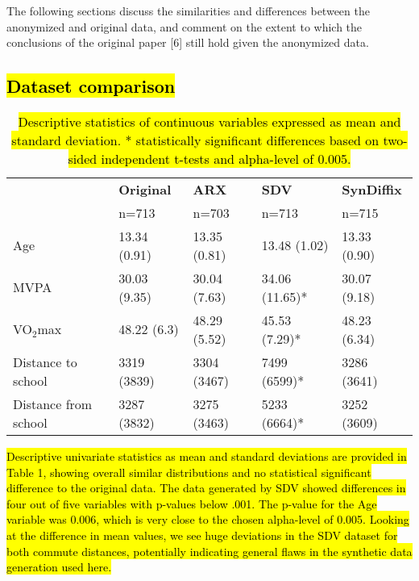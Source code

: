 \documentclass[10pt]{article}
\newcommand{\mycite}[1]{[#1]}
\begin{document}
The following sections discuss the similarities and differences between the anonymized and original data, and comment on the extent to which the conclusions of the original paper \mycite{6} still hold given the anonymized data.

\subsection*{\hl{Dataset comparison}}

\setlength{\fboxsep}{0pt}
\begin{table}
      \begin{center}
      \begin{small}
\begin{tabular}{lllll}
\toprule
 & \textbf{Original}  & \textbf{ARX} & \textbf{SDV} & \textbf{SynDiffix} \\
 & n=713 & n=703  & n=713  & n=715   \\
\midrule
Age & 13.34 (0.91) & 13.35 (0.81)  & 13.48 (1.02)  & 13.33 (0.90) \\
MVPA & 30.03 (9.35) & 30.04 (7.63) & 34.06 (11.65)* & 30.07 (9.18) \\
VO$_2$max & 48.22 (6.3) & 48.29 (5.52)  & 45.53 (7.29)*  & 48.23 (6.34) \\
Distance to school & 3319 (3839) & 3304 (3467) & 7499 (6599)* & 3286 (3641) \\
Distance from school & 3287 (3832) & 3275 (3463) & 5233 (6664)* & 3252 (3609) \\
\bottomrule
\end{tabular}
      \end{small}
      \caption{\hl{Descriptive statistics of continuous variables expressed as mean and standard deviation. * statistically significant differences based on two-sided independent t-tests and alpha-level of 0.005.}}
      \label{tab:table1}
      \end{center}
      \end{table}
	\setlength{\fboxsep}{3pt}

\hl{Descriptive univariate statistics as mean and standard deviations are provided in Table 1, showing overall similar distributions and no statistical significant difference to the original data. The data generated by SDV showed differences in four out of five variables with p-values below .001. The p-value for the Age variable was 0.006, which is very close to the chosen alpha-level of 0.005. Looking at the difference in mean values, we see huge deviations in the SDV dataset for both commute distances, potentially indicating general flaws in the synthetic data generation used here.}
\end{document}
